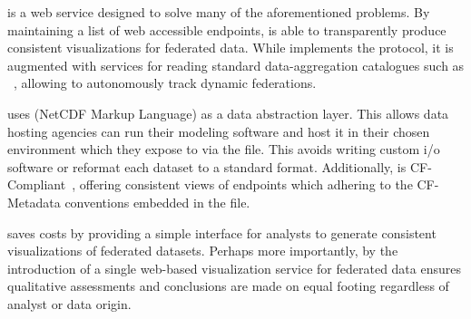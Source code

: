 \sciwms{} is a web service designed to solve many of the
aforementioned problems. By maintaining a list of web accessible
endpoints, \sciwms{} is able to transparently produce consistent
visualizations for federated data. While \sciwms{} implements the
\ogc{} \wms{} protocol, it is augmented with services for reading
standard data-aggregation catalogues such as \csw{}~\cite{csw},
allowing \sciwms{} to autonomously track dynamic federations. 

\sciwms{} uses \ncml{} (NetCDF Markup Language) as a data abstraction
layer. This allows data hosting agencies can run their modeling
software and host it in their chosen environment which they expose to
\sciwms{} via the \ncml{} file. This avoids writing custom i/o
software or reformat each dataset to a standard format. Additionally,
\sciwms{} is CF-Compliant~\cite{cf}, offering consistent views of
endpoints which adhering to the CF-Metadata conventions embedded in
the \ncml{} file.

\sciwms{} saves costs by providing a simple interface for analysts to
generate consistent visualizations of federated datasets. Perhaps more
importantly, by the introduction of a single web-based visualization
service for federated data ensures qualitative assessments and
conclusions are made on equal footing regardless of analyst or data
origin.
